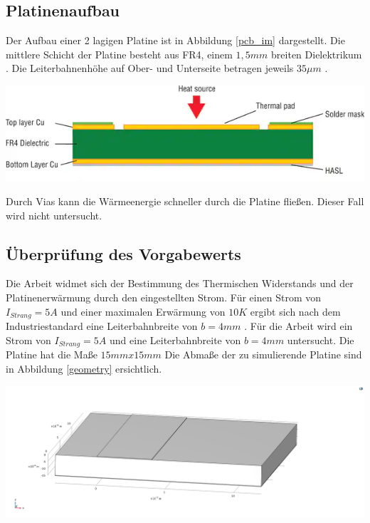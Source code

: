 \documentclass[10pt,a4paper,oneside,abstracton]{scrartcl}
\newenvironment{Figure}
  {\par\medskip\noindent\minipage{\linewidth}}
  {\endminipage\par\medskip}
\begin{document}
\begin{multicols}{2}
\subsection{Platinenaufbau}
Der Aufbau einer 2 lagigen Platine ist in Abbildung \ref*{pcb_im} dargestellt. 
\newline
Die mittlere Schicht der Platine besteht aus FR4, einem $ 1,5mm $ breiten Dielektrikum \cite{PCB_Querschnitt}. 
Die Leiterbahnenhöhe auf Ober- und Unterseite betragen jeweils $ 35 \mu m$ \cite{aisler}.
\begin{Figure}
	\includegraphics[width=\textwidth]{Bilder/PCB_Querschnitt.png}
	\label{pcb_im}
\end{Figure}

\noindent
Durch Vias kann die Wärmeenergie schneller durch die Platine fließen. 
Dieser Fall wird nicht untersucht.

\noindent



\subsection{Überprüfung des Vorgabewerts}
Die Arbeit widmet sich der Bestimmung des Thermischen Widerstands und der 
Platinenerwärmung durch den eingestellten Strom. 
\newline
Für einen Strom von $I_{Strang} = 5 A $ und einer maximalen Erwärmung von $10 K$ ergibt sich nach dem Industriestandard eine
Leiterbahnbreite von $b = 4 mm $ \cite{ipc}. \newline
Für die Arbeit wird ein Strom von $I_{Strang} = 5 A $ und eine Leiterbahnbreite von $b = 4 mm $ untersucht.
Die Platine hat die Maße $15mm x 15mm$
Die Abmaße der zu simulierende Platine sind in Abbildung \ref*{geometry} ersichtlich.


\begin{Figure}
	\includegraphics[width=\textwidth]{Bilder/Geometrie.png}
	\label{geometry}
\end{Figure}



\end{multicols}
\end{document}
